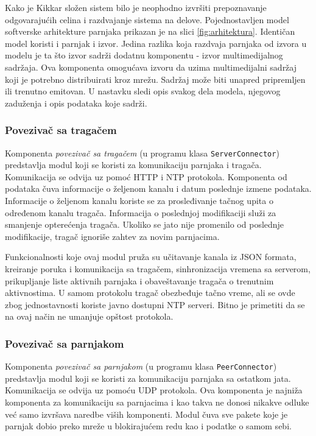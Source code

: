\documentclass[12pt,oneside]{memoir}
\begin{document}
Kako je Kikkar složen sistem bilo je neophodno izvršiti prepoznavanje odgovarajućih celina i razdvajanje sistema na delove. Pojednostavljen model softverske arhitekture parnjaka prikazan je na slici \ref{fig:arhitektura}. Identičan model koristi i parnjak i izvor. Jedina razlika koja razdvaja parnjaka od izvora u modelu je ta što izvor sadrži dodatnu komponentu - izvor multimedijalnog sadržaja. Ova komponenta omogućava izvoru da uzima multimedijalni sadržaj koji je potrebno distribuirati kroz mrežu. Sadržaj može biti unapred pripremljen ili trenutno emitovan. U nastavku sledi opis svakog dela modela, njegovog zaduženja i opis podataka koje sadrži.


\subsubsection{Povezivač sa tragačem}
\label{implementacija.2.3.1}

Komponenta \textit{povezivač sa tragačem} (u programu klasa \texttt{ServerConnector}) predstavlja modul koji se koristi za komunikaciju parnjaka i tragača. Komunikacija se odvija uz pomoć HTTP i NTP protokola. Komponenta od podataka čuva informacije o željenom kanalu i datum poslednje izmene podataka. Informacije o željenom kanalu koriste se za prosleđivanje tačnog upita o određenom kanalu tragača. Informacija o poslednjoj modifikaciji služi za smanjenje opterećenja tragača. Ukoliko se jato nije promenilo od poslednje modifikacije, tragač ignoriše zahtev za novim parnjacima. 

Funkcionalnosti koje ovaj modul pruža su učitavanje kanala iz JSON formata, kreiranje poruka i komunikacija sa tragačem, sinhronizacija vremena sa serverom, prikupljanje liste aktivnih parnjaka i obaveštavanje tragača o trenutnim aktivnostima. U samom protokolu tragač obezbeđuje tačno vreme, ali se ovde zbog jednostavnosti koriste javno dostupni NTP serveri. Bitno je primetiti da se na ovaj način ne umanjuje opštost protokola.  


\subsubsection{Povezivač sa parnjakom}
\label{implementacija.2.3.2}

Komponenta \textit{povezivač sa parnjakom} (u programu klasa \texttt{PeerConnector}) predstavlja modul koji se koristi za komunikaciju parnjaka sa ostatkom jata. Komunikacija se odvija uz pomoću UDP protokola. Ova komponenta je najniža komponenta za komunikaciju sa parnjacima i kao takva ne donosi nikakve odluke već samo izvršava naredbe viših komponenti. Modul čuva sve pakete koje je parnjak dobio preko mreže u blokirajućem redu kao i podatke o samom sebi.
\end{document}
